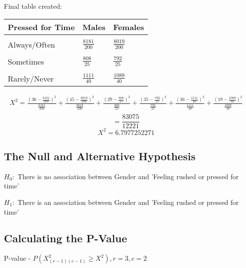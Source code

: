 \documentclass[oneside, a4paper]{article}
\begin{document}
\begin{center}
    Final table created:
    \begin{table}[H]
        \centering
        \begin{tabular}{|l|l|l|}
        \hline
        \textbf{Pressed for Time} & \textbf{Males} & \textbf{Females} \\ \hline
        \\[-1em]
        Always/Often              & $\frac{8181}{200}$              & $\frac{8019}{200}$               \\ \hline
        \\[-1em]
        Sometimes                 & $\frac{808}{25}$             & $\frac{792}{25}$               \\ \hline
        \\[-1em]
        Rarely/Never              & $\frac{1111}{40}$             & $\frac{1089}{40}$               \\ \hline
        \end{tabular}
    \end{table}
\end{center}

\begin{equation*}
    \begin{split}
        X^2 = \frac{(36-\frac{8181}{200})^2}{\frac{8181}{200}} + \frac{(45-\frac{8019}{200})^2}{\frac{8019}{200}} + \frac{(29-\frac{808}{25})^2}{\frac{808}{25}} + \frac{(35-\frac{792}{25})^2}{\frac{792}{25}} + \frac{(36-\frac{1111}{40})^2}{\frac{1111}{40}} + \frac{(19-\frac{1089}{40})^2}{\frac{1089}{40}} \\
    \end{split}
\end{equation*}
$$ = \frac{83075}{12221}$$
$$ X^2 = 6.7977252271$$

\subsection{The Null and Alternative Hypothesis}

$H_0:$ There is no association between Gender and 'Feeling rushed or pressed for time'

$H_1:$ There is an association between Gender and 'Feeling rushed or pressed for time'

\subsection{Calculating the P-Value}

P-value - $P(X^2_{(r-1)(c-1)} \geq X^2), r = 3, c = 2$
\end{document}
